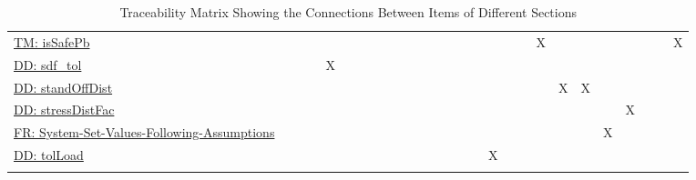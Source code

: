 \documentclass[12pt]{article}
\begin{document}
\begin{longtable}{l l l l l l l l l l l l l l l l l l l l l l l l l l l}
\\
\hyperref[TM:isSafePb]{TM: isSafePb} &  &  &  &  &  &  &  &  &  &  &  &  &  &  &  &  &  &  & X &  &  &  &  &  &  & X
\\
\hyperref[DD:sdf.tol]{DD: sdf\_tol} &  &  &  & X &  &  &  &  &  &  &  &  &  &  &  &  &  &  &  &  &  &  &  &  &  & 
\\
\hyperref[DD:standOffDist]{DD: standOffDist} &  &  &  &  &  &  &  &  &  &  &  &  &  &  &  &  &  &  &  & X & X &  &  &  &  & 
\\
\hyperref[DD:stressDistFac]{DD: stressDistFac} &  &  &  &  &  &  &  &  &  &  &  &  &  &  &  &  &  &  &  &  &  &  & X &  &  & 
\\
\hyperref[sysSetValsFollowingAssumps]{FR: System-Set-Values-Following-Assumptions} &  &  &  &  &  &  &  &  &  &  &  &  &  &  &  &  &  &  &  &  &  & X &  &  &  & 
\\
\hyperref[DD:tolLoad]{DD: tolLoad} &  &  &  &  &  &  &  &  &  &  &  &  &  &  &  & X &  &  &  &  &  &  &  &  &  & 
\\
\bottomrule
\caption{Traceability Matrix Showing the Connections Between Items of Different Sections}
\label{Table:Tracey}
\end{longtable}
\end{document}
